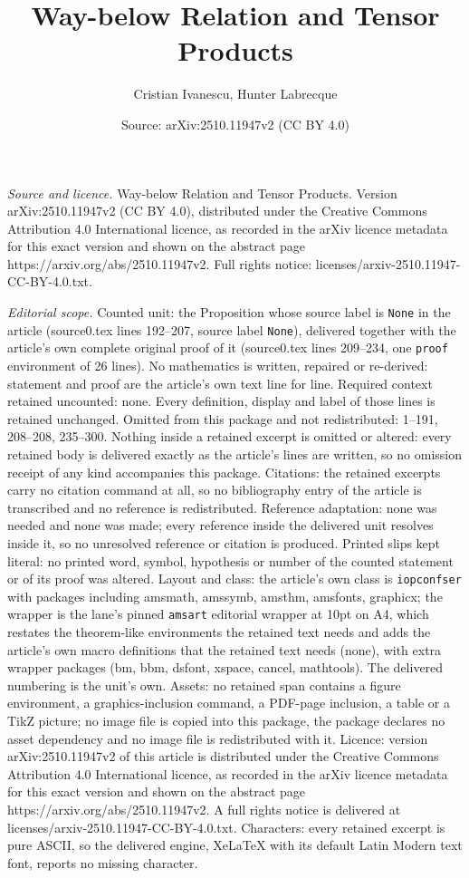 \documentclass[10pt,a4paper]{amsart}
\title[Way-below Relation and Tensor Products]{Way-below Relation and Tensor Products}
\author{Cristian Ivanescu, Hunter Labrecque}
\date{Source: arXiv:2510.11947v2 (CC BY 4.0)}
\begin{document}
\maketitle

\noindent\emph{Source and licence.} Way-below Relation and Tensor Products. Version arXiv:2510.11947v2 (CC BY 4.0), distributed under the Creative Commons Attribution 4.0 International licence, as recorded in the arXiv licence metadata for this exact version and shown on the abstract page https://arxiv.org/abs/2510.11947v2. Full rights notice: licenses/arxiv-2510.11947-CC-BY-4.0.txt.\par\smallskip

\noindent\textit{Editorial scope.} Counted unit: the Proposition whose source label is \texttt{None} in the article (source0.tex lines 192--207, source label \texttt{None}), delivered together with the article's own complete original proof of it (source0.tex lines 209--234, one \texttt{proof} environment of 26 lines). No mathematics is written, repaired or re-derived: statement and proof are the article's own text line for line. Required context retained uncounted: none. Every definition, display and label of those lines is retained unchanged. Omitted from this package and not redistributed: 1--191, 208--208, 235--300. Nothing inside a retained excerpt is omitted or altered: every retained body is delivered exactly as the article's lines are written, so no omission receipt of any kind accompanies this package. Citations: the retained excerpts carry no citation command at all, so no bibliography entry of the article is transcribed and no reference is redistributed. Reference adaptation: none was needed and none was made; every reference inside the delivered unit resolves inside it, so no unresolved reference or citation is produced. Printed slips kept literal: no printed word, symbol, hypothesis or number of the counted statement or of its proof was altered. Layout and class: the article's own class is \texttt{iopconfser} with packages including amsmath, amssymb, amsthm, amsfonts, graphicx; the wrapper is the lane's pinned \texttt{amsart} editorial wrapper at 10pt on A4, which restates the theorem-like environments the retained text needs and adds the article's own macro definitions that the retained text needs (none), with extra wrapper packages (bm, bbm, dsfont, xspace, cancel, mathtools). The delivered numbering is the unit's own. Assets: no retained span contains a figure environment, a graphics-inclusion command, a PDF-page inclusion, a table or a TikZ picture; no image file is copied into this package, the package declares no asset dependency and no image file is redistributed with it. Licence: version arXiv:2510.11947v2 of this article is distributed under the Creative Commons Attribution 4.0 International licence, as recorded in the arXiv licence metadata for this exact version and shown on the abstract page https://arxiv.org/abs/2510.11947v2. A full rights notice is delivered at licenses/arxiv-2510.11947-CC-BY-4.0.txt. Characters: every retained excerpt is pure ASCII, so the delivered engine, XeLaTeX with its default Latin Modern text font, reports no missing character.
\end{document}

